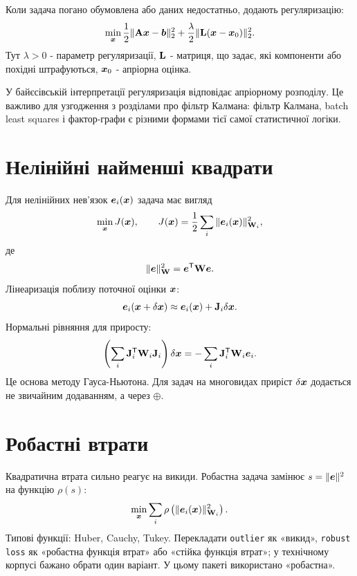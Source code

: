 Коли задача погано обумовлена або даних недостатньо, додають регуляризацію:
\begin{equation}
    \min_{\bm{x}} \frac{1}{2}\|\mathbf{A}\bm{x}-\bm{b}\|_2^2 + \frac{\lambda}{2}\|\mathbf{L}(\bm{x}-\bm{x}_0)\|_2^2.
\end{equation}
Тут $\lambda>0$ - параметр регуляризації, $\mathbf{L}$ - матриця, що задає, які компоненти або похідні штрафуються, $\bm{x}_0$ - апріорна оцінка.

У байєсівській інтерпретації регуляризація відповідає апріорному розподілу. Це важливо для узгодження з розділами про фільтр Калмана: фільтр Калмана, batch least squares і фактор-графи є різними формами тієї самої статистичної логіки.

\section{Нелінійні найменші квадрати}

Для нелінійних нев'язок $\bm{e}_i(\bm{x})$ задача має вигляд
\begin{equation}
    \min_{\bm{x}} J(\bm{x}),
    \qquad
    J(\bm{x})=\frac{1}{2}\sum_i \|\bm{e}_i(\bm{x})\|_{\mathbf{W}_i}^2,
\end{equation}
де
\begin{equation}
    \|\bm{e}\|_{\mathbf{W}}^2=\bm{e}^{\mathsf{T}}\mathbf{W}\bm{e}.
\end{equation}
Лінеаризація поблизу поточної оцінки $\bm{x}$:
\begin{equation}
    \bm{e}_i(\bm{x}+\delta\bm{x})\approx \bm{e}_i(\bm{x})+\mathbf{J}_i\delta\bm{x}.
\end{equation}
Нормальні рівняння для приросту:
\begin{equation}
    \left(\sum_i \mathbf{J}_i^{\mathsf{T}}\mathbf{W}_i\mathbf{J}_i\right)\delta\bm{x}
    =
    -\sum_i \mathbf{J}_i^{\mathsf{T}}\mathbf{W}_i\bm{e}_i.
\end{equation}
Це основа методу Гауса-Ньютона. Для задач на многовидах приріст $\delta\bm{x}$ додається не звичайним додаванням, а через $\oplus$.

\section{Робастні втрати}

Квадратична втрата сильно реагує на викиди. Робастна задача замінює $s=\|\bm{e}\|^2$ на функцію $\rho(s)$:
\begin{equation}
    \min_{\bm{x}} \sum_i \rho\left(\|\bm{e}_i(\bm{x})\|_{\mathbf{W}_i}^2\right).
\end{equation}
Типові функції: Huber, Cauchy, Tukey. Перекладати \texttt{outlier} як «викид», \texttt{robust loss} як «робастна функція втрат» або «стійка функція втрат»; у технічному корпусі бажано обрати один варіант. У цьому пакеті використано «робастна».

